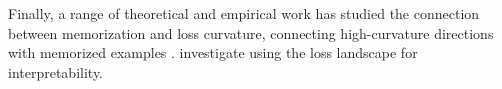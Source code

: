 \documentclass{article} %
\begin{document}
Finally, a range of theoretical and empirical work has studied the connection between memorization and loss curvature, connecting high-curvature directions with memorized examples \citep{foretsharpness, hochreiter1997flat, lecun1989optimal, hassibi1993optimal, keskar2017large, garg2024memorization, ravikumar2024unveiling, jeon2024understanding, kim2023memorization}. \citet{bushnaq2024using} investigate using the loss landscape for interpretability.









\end{document}

